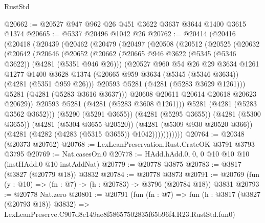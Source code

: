 \begin{lexlean}{RustStd}
\begin{coremodule}
@20662 := @20527 @947 @962 @26 @451 @3622 @3637 @3644 @1400 @3615 @1374
@20665 := @5337 @20496 @1042 @26
@20762 := @20414
    (@20416
      (@20418
        (@20439
          (@20462
            (@20479
              (@20497
                (@20508
                  (@20512
                    (@20525
                      (@20632
                        (@20642
                          (@20646
                            (@20652
                              (@20662
                                (@20665 @946 @3622 (@5345 (@5346 @3622)) (@4281 (@5351 @946 @26)))
                                (@20527
                                  @960
                                  @54
                                  @26
                                  @29
                                  @3634
                                  @1261
                                  @1277
                                  @1400
                                  @3628
                                  @1374
                                  (@20665 @959 @3634 (@5345 (@5346 @3634)) (@4281 (@5351 @959 @26)))
                                  @20593
                                  @5281
                                  (@4281 (@5283 @3629 @1261)))
                                @5281
                                (@4281 (@5283 @3616 @3637)))
                              @20608
                              @20611
                              @20614
                              @20618
                              @20623
                              @20629))
                          @20593
                          @5281
                          (@4281 (@5283 @3608 @1261)))
                        @5281
                        (@4281 (@5283 @3562 @3652)))
                      (@5290 (@5291 @3655))
                      (@4281 (@5295 @3655))
                      (@4281 (@5300 @3655))
                      (@4281 (@5304 @3655 @20520))
                      (@4281 (@5309 @930 @20520 @366))
                      (@4281 (@4282 (@4283 (@5315 @3655)) @1042)))))))))))
@20764 := @20348 (@20373 @20762)
@20768 := LexLeanPreservation.Rust.CrateOK @3791 @3793 @3795
@20769 := Nat.casesOn.{0}
@20778 := HAdd.hAdd.{0, 0, 0} @10 @10 @10 (instHAdd.{0} @10 instAddNat)
@20779 := @20778 @3875
@20783 := @3817 (@3827 (@20779 @18)) @3832
@20784 := @20778 @3873
@20791 := @20769 (fun (y : @10) => (fn : @7) -> (h : @20783) -> @3796 (@20784 @18)) @3831
@20793 := @20778 Nat.zero
@20801 := @20791
    (fun (fn : @7) =>
    fun (h : @3817 (@3827 (@20793 @18)) @3832) =>
    LexLeanPreserve.C907d8c149ae8f58657502835f65b96f4.R23.RustStd.fun0)

\end{coremodule}
\end{lexlean}
